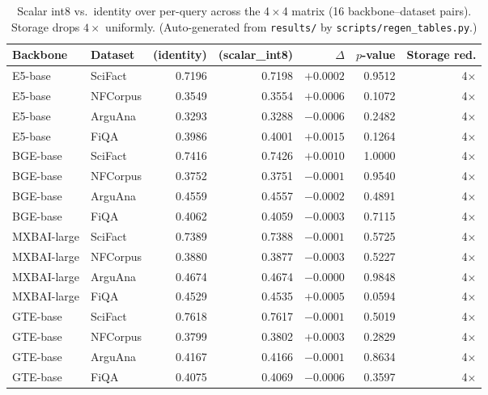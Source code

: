 \begin{table}[t]
\centering
\small
\caption{Scalar int8 vs.\ identity over per-query \ndcg{} across the 4\,$\times$\,4 matrix (16 backbone--dataset pairs). Storage drops $4\times$ uniformly. (Auto-generated from \texttt{results/} by \texttt{scripts/regen\_tables.py}.)}
\label{tab:scalar-int8}
\begin{tabular}{llrrrrr}
\toprule
Backbone & Dataset & \ndcg{} (identity) & \ndcg{} (scalar\_int8) & $\Delta$ & $p$-value & Storage red. \\
\midrule
E5-base & SciFact & 0.7196 & 0.7198 & $+0.0002$ & 0.9512 & 4$\times$ \\
E5-base & NFCorpus & 0.3549 & 0.3554 & $+0.0006$ & 0.1072 & 4$\times$ \\
E5-base & ArguAna & 0.3293 & 0.3288 & $-0.0006$ & 0.2482 & 4$\times$ \\
E5-base & FiQA & 0.3986 & 0.4001 & $+0.0015$ & 0.1264 & 4$\times$ \\
BGE-base & SciFact & 0.7416 & 0.7426 & $+0.0010$ & 1.0000 & 4$\times$ \\
BGE-base & NFCorpus & 0.3752 & 0.3751 & $-0.0001$ & 0.9540 & 4$\times$ \\
BGE-base & ArguAna & 0.4559 & 0.4557 & $-0.0002$ & 0.4891 & 4$\times$ \\
BGE-base & FiQA & 0.4062 & 0.4059 & $-0.0003$ & 0.7115 & 4$\times$ \\
MXBAI-large & SciFact & 0.7389 & 0.7388 & $-0.0001$ & 0.5725 & 4$\times$ \\
MXBAI-large & NFCorpus & 0.3880 & 0.3877 & $-0.0003$ & 0.5227 & 4$\times$ \\
MXBAI-large & ArguAna & 0.4674 & 0.4674 & $-0.0000$ & 0.9848 & 4$\times$ \\
MXBAI-large & FiQA & 0.4529 & 0.4535 & $+0.0005$ & 0.0594 & 4$\times$ \\
GTE-base & SciFact & 0.7618 & 0.7617 & $-0.0001$ & 0.5019 & 4$\times$ \\
GTE-base & NFCorpus & 0.3799 & 0.3802 & $+0.0003$ & 0.2829 & 4$\times$ \\
GTE-base & ArguAna & 0.4167 & 0.4166 & $-0.0001$ & 0.8634 & 4$\times$ \\
GTE-base & FiQA & 0.4075 & 0.4069 & $-0.0006$ & 0.3597 & 4$\times$ \\
\bottomrule
\end{tabular}
\end{table}
